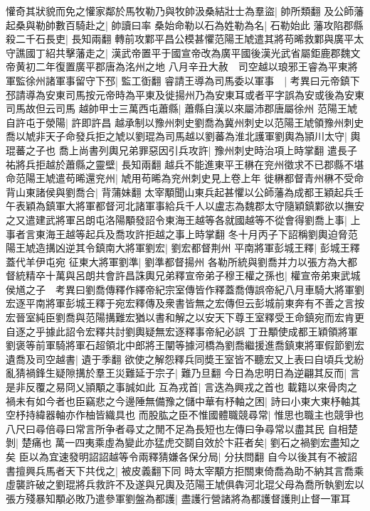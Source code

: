 懽奇其狀貌而免之懽家鄰於馬牧勒乃與牧帥汲桑結壯士為羣盜|{
	帥所類翻}
及公師藩起桑與勒帥數百騎赴之|{
	帥讀曰率}
桑始命勒以石為姓勒為名|{
	石勒始此}
藩攻陷郡縣殺二千石長吏|{
	長知兩翻}
轉前攻鄴平昌公模甚懼范陽王虓遣其將苟晞救鄴與廣平太守譙國丁紹共擊藩走之|{
	漢武帝置平于國宣帝改為廣平國後漢光武省屬鉅鹿郡魏文帝黄初二年復置廣平郡唐為洺州之地}
八月辛丑大赦　司空越以琅邪王睿為平東將軍監徐州諸軍事留守下邳|{
	監工衘翻}
睿請王導為司馬委以軍事　|{
	考異曰元帝鎮下邳請導為安東司馬按元帝時為平東及徙揚州乃為安東耳或者平字誤為安或後為安東司馬故但云司馬}
越帥甲士三萬西屯蕭縣|{
	蕭縣自漢以來屬沛郡唐屬徐州}
范陽王虓自許屯于滎陽|{
	許即許昌}
越承制以豫州刺史劉喬為冀州刺史以范陽王虓領豫州刺史喬以虓非天子命發兵拒之虓以劉琨為司馬越以劉蕃為淮北護軍劉輿為頴川太守|{
	輿琨蕃之子也}
喬上尚書列輿兄弟罪惡因引兵攻許|{
	豫州刺史時治項上時掌翻}
遣長子祐將兵拒越於蕭縣之靈壁|{
	長知兩翻}
越兵不能進東平王楙在兖州徵求不已郡縣不堪命范陽王虓遣苟晞還兖州|{
	虓用苟晞為兖州刺史見上卷上年}
徙楙都督青州楙不受命背山東諸侯與劉喬合|{
	背蒲妹翻}
太宰顒聞山東兵起甚懼以公師藩為成都王穎起兵壬午表穎為鎮軍大將軍都督河北諸軍事給兵千人以盧志為魏郡太守隨穎鎮鄴欲以撫安之又遣建武將軍呂朗屯洛陽顒發詔令東海王越等各就國越等不從會得劉喬上事|{
	上事者言東海王越等起兵及喬攻許拒越之事上時掌翻}
冬十月丙子下詔稱劉輿迫脅范陽王虓造搆凶逆其令鎮南大將軍劉宏|{
	劉宏都督荆州}
平南將軍彭城王釋|{
	彭城王釋蓋代羊伊屯宛}
征東大將軍劉準|{
	劉準都督揚州}
各勒所統與劉喬并力以張方為大都督統精卒十萬與呂朗共會許昌誅輿兄弟釋宣帝弟子穆王權之孫也|{
	權宣帝弟東武城侯馗之子　考異曰劉喬傳釋作繹帝紀宗室傳皆作釋蓋喬傳誤帝紀八月車騎大將軍劉宏逐平南將軍彭城王釋于宛宏釋傳及衆書皆無之宏傳但云彭城前東奔有不善之言按宏晉室純臣劉喬與范陽搆難宏猶以書和解之以安天下尊王室釋受王命鎮宛而宏肯更自逐之乎據此詔令宏釋共討劉輿疑無宏逐釋事帝紀必誤}
丁丑顒使成都王穎領將軍劉褒等前軍騎將軍石超領北中郎將王闡等據河橋為劉喬繼援進喬鎮東將軍假節劉宏遺喬及司空越書|{
	遺于季翻}
欲使之解怨釋兵同奬王室皆不聽宏又上表曰自頃兵戈紛亂猜禍鋒生疑隙搆於羣王災難延于宗子|{
	難乃旦翻}
今日為忠明日為逆翩其反而|{
	言是非反覆之易冏乂頴顒之事誠如此}
互為戎首|{
	言迭為興戎之首也}
載籍以來骨肉之禍未有如今者也臣竊悲之今邊陲無備豫之儲中華有杼軸之困|{
	詩曰小東大東杼軸其空杼持緯器軸亦作柚皆織具也}
而股肱之臣不惟國體職競尋常|{
	惟思也職主也競爭也八尺曰尋倍尋曰常言所争者尋丈之閒不足為長短也左傳曰争尋常以盡其民}
自相楚剝|{
	楚痛也}
萬一四夷乘虛為變此亦猛虎交鬬自效於卞莊者矣|{
	劉石之禍劉宏盡知之矣}
臣以為宜速發明詔詔越等令兩釋猜嫌各保分局|{
	分扶問翻}
自今以後其有不被詔書擅興兵馬者天下共伐之|{
	被皮義翻下同}
時太宰顒方拒關東倚喬為助不納其言喬乘虛襲許破之劉琨將兵救許不及遂與兄輿及范陽王虓俱犇河北琨父母為喬所執劉宏以張方殘暴知顒必敗乃遣參軍劉盤為都護|{
	盡護行營諸將為都護督護則止督一軍耳}

